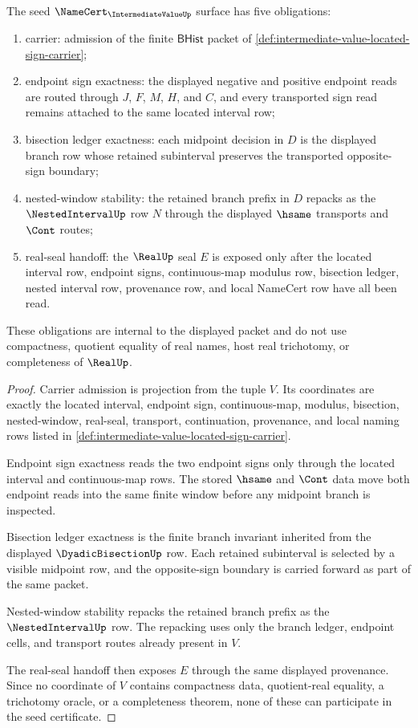\begin{theorem}
\label{thm:intermediate-value-dyadic-bisection-obligations}
The seed $\NameCert_{\IntermediateValueUp}$ surface has five obligations:
\begin{enumerate}
\item carrier: admission of the finite $\mathsf{BHist}$ packet of \autoref{def:intermediate-value-located-sign-carrier};
\item endpoint sign exactness: the displayed negative and positive endpoint reads are routed through $J$, $F$, $M$, $H$, and $C$, and every transported sign read remains attached to the same located interval row;
\item bisection ledger exactness: each midpoint decision in $D$ is the displayed branch row whose retained subinterval preserves the transported opposite-sign boundary;
\item nested-window stability: the retained branch prefix in $D$ repacks as the $\NestedIntervalUp$ row $N$ through the displayed $\hsame$ transports and $\Cont$ routes;
\item real-seal handoff: the $\RealUp$ seal $E$ is exposed only after the located interval row, endpoint signs, continuous-map modulus row, bisection ledger, nested interval row, provenance row, and local NameCert row have all been read.
\end{enumerate}
These obligations are internal to the displayed packet and do not use compactness, quotient equality of real names, host real trichotomy, or completeness of $\RealUp$.
\end{theorem}
\begin{proof}
Carrier admission is projection from the tuple $V$. Its coordinates are exactly the located interval, endpoint sign, continuous-map, modulus, bisection, nested-window, real-seal, transport, continuation, provenance, and local naming rows listed in \autoref{def:intermediate-value-located-sign-carrier}.

Endpoint sign exactness reads the two endpoint signs only through the located interval and continuous-map rows. The stored $\hsame$ and $\Cont$ data move both endpoint reads into the same finite window before any midpoint branch is inspected.

Bisection ledger exactness is the finite branch invariant inherited from the displayed $\DyadicBisectionUp$ row. Each retained subinterval is selected by a visible midpoint row, and the opposite-sign boundary is carried forward as part of the same packet.

Nested-window stability repacks the retained branch prefix as the $\NestedIntervalUp$ row. The repacking uses only the branch ledger, endpoint cells, and transport routes already present in $V$.

The real-seal handoff then exposes $E$ through the same displayed provenance. Since no coordinate of $V$ contains compactness data, quotient-real equality, a trichotomy oracle, or a completeness theorem, none of these can participate in the seed certificate.
\end{proof}

